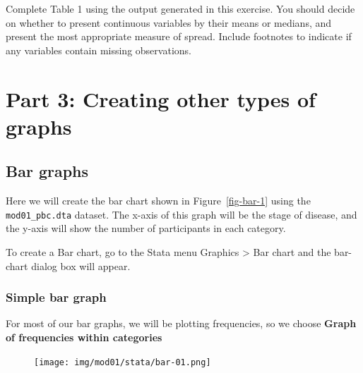 \documentclass[
  a4paper,
]{memoir}
\begin{document}
\begin{tcolorbox}[enhanced jigsaw, title={TASK}, opacitybacktitle=0.6, colbacktitle=quarto-callout-note-color!10!white, titlerule=0mm, colframe=quarto-callout-note-color-frame, opacityback=0, left=2mm, breakable, bottomtitle=1mm, coltitle=black, bottomrule=.15mm, arc=.35mm, rightrule=.15mm, toptitle=1mm, colback=white, toprule=.15mm, leftrule=.75mm]

Complete Table 1 using the output generated in this exercise. You should
decide on whether to present continuous variables by their means or
medians, and present the most appropriate measure of spread. Include
footnotes to indicate if any variables contain missing observations.

\end{tcolorbox}

\hypertarget{part-3-creating-other-types-of-graphs}{%
\section{Part 3: Creating other types of
graphs}\label{part-3-creating-other-types-of-graphs}}

\hypertarget{bar-graphs}{%
\subsection{Bar graphs}\label{bar-graphs}}

Here we will create the bar chart shown in Figure~\ref{fig-bar-1} using
the \texttt{mod01\_pbc.dta} dataset. The x-axis of this graph will be
the stage of disease, and the y-axis will show the number of
participants in each category.

To create a Bar chart, go to the Stata menu Graphics \textgreater{} Bar
chart and the bar-chart dialog box will appear.

\hypertarget{simple-bar-graph}{%
\subsubsection{Simple bar graph}\label{simple-bar-graph}}

For most of our bar graphs, we will be plotting frequencies, so we
choose \textbf{Graph of frequencies within categories}

\begin{figure}[H]

{\centering \texttt{[image: img/mod01/stata/bar-01.png]}

}

\end{figure}
\end{document}
